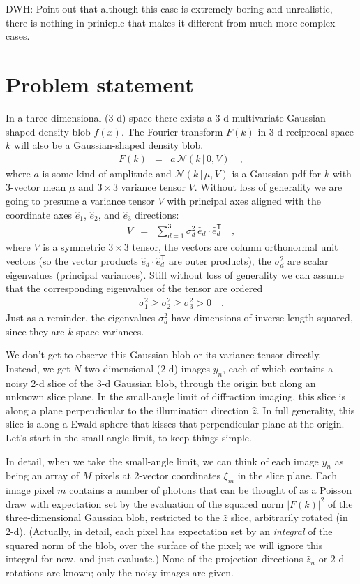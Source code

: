 \documentclass[12pt]{article}
\newcommand{\normal}{\mathscr{N}}
\newcommand{\sqnorm}[1]{|{#1}|^2}
\newcommand{\unitvec}[1]{\hat{#1}}
\newcommand{\ehat}{\unitvec{e}}
\newcommand{\zhat}{\unitvec{z}}
\newcommand{\transpose}{^{\mathsf{T}}}
\newcommand{\given}{\,|\,}
\begin{document}
DWH: Point out that although this case is extremely boring and
unrealistic, there is nothing in prinicple that makes it different
from much more complex cases.

\section{Problem statement}

In a three-dimensional (3-d) space there exists a 3-d multivariate
Gaussian-shaped density blob $f(x)$.
The Fourier transform $F(k)$ in 3-d reciprocal space $k$ will
also be a Gaussian-shaped density blob.
\begin{eqnarray}
  F(k) &=& a\,\normal(k\given 0, V)
  \quad ,
\end{eqnarray}
where $a$ is some kind of amplitude and $\normal(k\given\mu, V)$ is a
Gaussian pdf for $k$ with 3-vector mean $\mu$ and $3\times 3$ variance
tensor $V$.
Without loss of generality we are going to presume a variance tensor
$V$ with principal axes aligned with the coordinate axes $\ehat_1$,
$\ehat_2$, and $\ehat_3$ directions:
\begin{eqnarray}
  V &=& \sum_{d=1}^3 \sigma^2_d \, \ehat_d\cdot\ehat_d\transpose
  \quad ,
\end{eqnarray}
where $V$ is a symmetric $3\times3$ tensor, the vectors are column
orthonormal unit vectors (so the vector products
$\ehat_d\cdot\ehat_d\transpose$ are outer products), the $\sigma^2_d$ are
scalar eigenvalues (principal variances).
Still without loss of generality we can assume that the corresponding
eigenvalues of the tensor are ordered
\begin{eqnarray}
  \sigma^2_1 \geq \sigma^2_2 \geq \sigma^2_3 > 0
  \quad .
\end{eqnarray}
Just as a reminder, the eigenvalues $\sigma^2_d$ have dimensions of
inverse length squared, since they are $k$-space variances.

We don't get to observe this Gaussian blob or its variance tensor
directly.
Instead, we get $N$ two-dimensional (2-d) images $y_n$, each of which
contains a noisy 2-d slice of the 3-d Gaussian blob, through the origin
but along an unknown slice plane.
In the small-angle limit of diffraction imaging, this slice is along a
plane perpendicular to the illumination direction $\zhat$.
In full generality, this slice is along a Ewald sphere that kisses
that perpendicular plane at the origin.
Let's start in the small-angle limit, to keep things simple.

In detail, when we take the small-angle limit, we can think of each
image $y_n$ as being an array of $M$ pixels at
2-vector coordinates $\xi_m$ in the slice plane.
Each image pixel $m$ contains a number of photons that can be thought
of as a Poisson draw with expectation set by the evaluation of the
squared norm $\sqnorm{F(k)}$ of the three-dimensional Gaussian
blob, restricted to the $\zhat$ slice, arbitrarily rotated (in 2-d).
(Actually, in detail, each pixel has expectation set by an
\emph{integral} of the squared norm of the blob, over the surface of
the pixel; we will ignore this integral for now, and just evaluate.)
None of the projection directions $\zhat_n$ or 2-d rotations are
known; only the noisy images are given.
\end{document}
